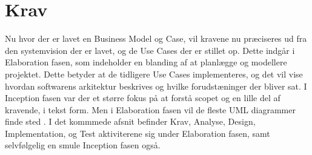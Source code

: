 \chapter{Krav}\label{ch:krav}
Nu hvor der er lavet en Business Model og Case, vil kravene nu præciseres ud fra den systemvision der er lavet, og de Use Cases der er stillet op. Dette indgår i Elaboration fasen, som indeholder en blanding af at planlægge og modellere projektet. Dette betyder at de tidligere Use Cases implementeres, og det vil vise hvordan softwarens arkitektur beskrives og hvilke forudstæninger der bliver sat. I Inception fasen var der et større fokus på at forstå scopet og en lille del af kravende, i tekst form. Men i Elaboration fasen vil de fleste UML diagrammer finde sted \cite{Larman2004}. I det kommmede afsnit befinder Krav, Analyse, Design, Implementation, og Test aktiviterene sig under Elaboration fasen, samt selvfølgelig en smule Inception fasen også. 



 